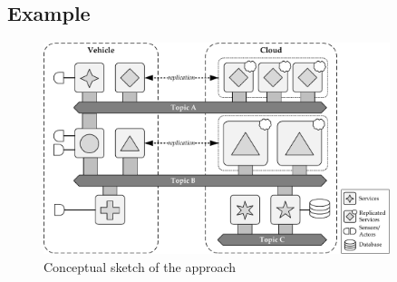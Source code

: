 \subsection{Example}
\begin{figure}[htpb]
  \centering
  \includegraphics[width=0.9\textwidth]{figures/idea.pdf}
  \caption[Conceptual sketch of the approach]{Conceptual sketch of the approach}\label{fig:idea}
\end{figure}
